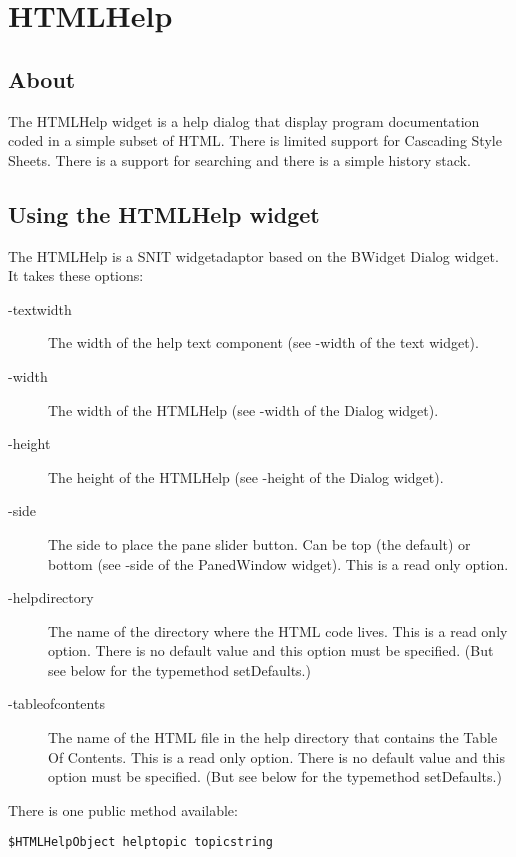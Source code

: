 \chapter{HTMLHelp}

\section{About}

The HTMLHelp widget is a help dialog that display program documentation
coded in a simple subset of HTML.  There is limited support for
Cascading Style Sheets.  There is a support for searching and there is a
simple history stack.

\section{Using the HTMLHelp widget}

The HTMLHelp is a SNIT widgetadaptor based on the BWidget Dialog widget.
It takes these options:

\begin{description}
\item[-textwidth] The width of the help text component (see -width of
the text widget).
\item[-width] The width of the HTMLHelp (see -width of the Dialog
widget).
\item[-height] The height of the HTMLHelp (see -height of the Dialog
widget).
\item[-side] The side to place the pane slider button.  Can be top (the
default) or bottom (see -side of the PanedWindow widget). This is a read
only option.
\item[-helpdirectory] The name of the directory where the HTML code
lives. This is a read only option.  There is no default value and this
option must be specified. (But see below for the typemethod
setDefaults.)
\item[-tableofcontents] The name of the HTML file in the help directory
that contains the Table Of Contents.  This is a read only option. 
There is no default value and this option must be specified. (But see
below for the typemethod setDefaults.)
\end{description}

There is one public method available:

\begin{verbatim}
$HTMLHelpObject helptopic topicstring
\end{verbatim}

